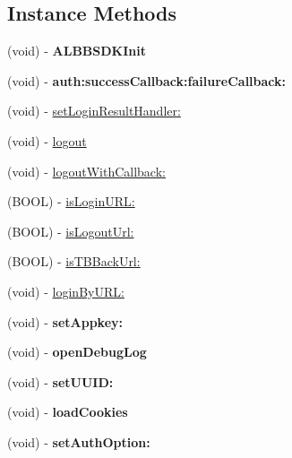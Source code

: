 \subsection*{Instance Methods}
\begin{DoxyCompactItemize}
\item 
\mbox{\label{interface_a_l_b_b_s_d_k_ab2a08ad830b4a31ff738873908892382}} 
(void) -\/ {\bfseries A\+L\+B\+B\+S\+D\+K\+Init}
\item 
\mbox{\label{interface_a_l_b_b_s_d_k_af571879b41201602d230e7aa459aa96d}} 
(void) -\/ {\bfseries auth\+:success\+Callback\+:failure\+Callback\+:}
\item 
(void) -\/ \mbox{\hyperlink{interface_a_l_b_b_s_d_k_aa834b88348aed1ba4dfcbf3d40008a16}{set\+Login\+Result\+Handler\+:}}
\item 
(void) -\/ \mbox{\hyperlink{interface_a_l_b_b_s_d_k_a420911b69ce41a65747583bcb42340f6}{logout}}
\item 
(void) -\/ \mbox{\hyperlink{interface_a_l_b_b_s_d_k_a9143f04527cc0f1e7f6f129e366368b9}{logout\+With\+Callback\+:}}
\item 
(B\+O\+OL) -\/ \mbox{\hyperlink{interface_a_l_b_b_s_d_k_acdf1f6a0be373bae7ebb6e23b3fb7c6a}{is\+Login\+U\+R\+L\+:}}
\item 
(B\+O\+OL) -\/ \mbox{\hyperlink{interface_a_l_b_b_s_d_k_a50a4e40ab51b51645327aa5aeb1c582f}{is\+Logout\+Url\+:}}
\item 
(B\+O\+OL) -\/ \mbox{\hyperlink{interface_a_l_b_b_s_d_k_acea340fcaf1cb3a8023c7f6fc1e1a4ee}{is\+T\+B\+Back\+Url\+:}}
\item 
(void) -\/ \mbox{\hyperlink{interface_a_l_b_b_s_d_k_aa034c7824b7ba7794f488c984c9cc88c}{login\+By\+U\+R\+L\+:}}
\item 
\mbox{\label{interface_a_l_b_b_s_d_k_a0c31b170886c67d4e4b69058acc5cb23}} 
(void) -\/ {\bfseries set\+Appkey\+:}
\item 
\mbox{\label{interface_a_l_b_b_s_d_k_ac069e3c45163ea9803d4a9ee599625bb}} 
(void) -\/ {\bfseries open\+Debug\+Log}
\item 
\mbox{\label{interface_a_l_b_b_s_d_k_a93f002d89dc12748378400c09280e725}} 
(void) -\/ {\bfseries set\+U\+U\+I\+D\+:}
\item 
\mbox{\label{interface_a_l_b_b_s_d_k_aa75d3884485c7524809dc0a50efdde44}} 
(void) -\/ {\bfseries load\+Cookies}
\item 
\mbox{\label{interface_a_l_b_b_s_d_k_a2edb346eb4627a0a6d31f50ee7768e6a}} 
(void) -\/ {\bfseries set\+Auth\+Option\+:}
\end{DoxyCompactItemize}
